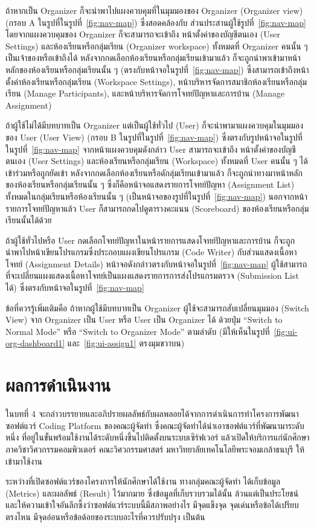 \documentclass[12pt,one side,openright,a4paper]{cpe-thesis-th}
\newcommand{\thaijustify}[1]{%
  \par\hspace{30pt}\justifying
  #1
}
\begin{document}
\thaijustify{
  ถ้าหากเป็น Organizer ก็จะนำพาไปแผงควบคุมที่ในมุมมองของ Organizer (Organizer view) (กรอบ A ในรูปที่ในรูปที่~\ref{fig:nav-map}) ซึ่งสอดคล้องกับ ส่วนประสานผู้ใช้รูปที่~\ref{fig:nav-map} โดยจากแผงควบคุมของ Organizer ก็จะสามารถจะเข้าถึง หน้าตั้งค่าของบัญชีตนเอง (User Settings) และห้องเรียนหรือกลุ่มเรียน (Organizer workspace) ทั้งหมดที่ Organizer คนนั้น ๆ เป็นเจ้าของหรือเข้าถึงได้ หลังจากกดเลือกห้องเรียนหรือกลุ่มเรียนเข้ามาแล้ว ก็จะถูกนำพาเข้ามาหน้าหลักของห้องเรียนหรือกลุ่มเรียนนั้น ๆ (ตรงกับหน้าจอในรูปที่~\ref{fig:nav-map}) ซึ่งสามารถเข้าถึงหน้าตั้งค่าห้องเรียนหรือกลุ่มเรียน (Workspace Settings), หน้าบริหารจัดการสมาชิกห้องเรียนหรือกลุ่มเรียน (Manage Participants), และหน้าบริหารจัดการโจทย์ปัญหาและการบ้าน (Manage Assignment)
}
\thaijustify{
  ถ้าผู้ใช้ไม่ได้มีบทบาทเป็น Organizer แต่เป็นผู้ใช้ทั่วไป (User) ก็จะนำพามาแผงควบคุมในมุมมองของ User (User View) (กรอบ B ในรูปที่ในรูปที่~\ref{fig:nav-map}) ซึ่งตรงกับรูปหน้าจอในรูปที่ในรูปที่~\ref{fig:nav-map} จากหน้าแผงควบคุมดังกล่าว User สามารถจะเข้าถึง หน้าตั้งค่าของบัญชีตนเอง (User Settings) และห้องเรียนหรือกลุ่มเรียน (Workspace) ทั้งหมดที่ User คนนั้น ๆ ได้เข้าร่วมหรือถูกยัดเข้า หลังจากกดเลือกห้องเรียนหรือดักลุ่มเรียนเข้ามาแล้ว ก็จะถูกนำทางมาหน้าหลักของห้องเรียนหรือกลุ่มเรียนนั้น ๆ ซึ่งก็คือหน้าจอแสดงรายการโจทย์ปัญหา (Assignment List) ทั้งหมดในกลุ่มเรียนหรือห้องเรียนนั้น ๆ (เป็นหน้าจอของรูปที่ในรูปที่~\ref{fig:nav-map}) นอกจากหน้ารายการโจทย์ปัญหาแล้ว User ก็สามารถกดไปดูตารางคะแนน (Scoreboard) ของห้องเรียนหรือกลุ่มเรียนนั้นได้ด้วย
}
\thaijustify{
  ถ้าผู้ใช้ทั่วไปหรือ User กดเลือกโจทย์ปัญหาในหน้ารายการแสดงโจทย์ปัญหาและการบ้าน ก็จะถูกนำพาไปหน้าเขียนโปรแกรมซึ่งประกอบแผงเขียนโปรแกรม (Code Writer) กับส่วนแสดงเนื้อหาโจทย์ (Assignment Details) หน้าจอดังกล่าวตรงกับหน้าจอในรูปที่~\ref{fig:nav-map} ผู้ใช้สามารถที่จะเปลี่ยนแผงแสดงเนื้อหาโจทย์เป็นแผงแสดงรายการการส่งโปรแกรมตรวจ (Submission List ได้) ซึ่งตรงกับหน้าจอในรูปที่~\ref{fig:nav-map}
}
\thaijustify{
  ข้อที่ควรรู้เพิ่มเติมคือ ถ้าหากผู้ใช้มีบทบาทเป็น Organizer ผู้ใช้จะสามารถสับเปลี่ยนมุมมอง (Switch View) จาก Organizer เป็น User หรือ User เป็น Organizer ได้ ด้วยปุ่ม “Switch to Normal Mode” หรือ “Switch to Organizer Mode” ตามลำดับ (มีให้เห็นในรูปที่~\ref{fig:ui-org-dashboard1} และ~\ref{fig:ui-assign1} ตรงมุมขวาบน)
}
\pagebreak
\pagebreak
\chapter{ผลการดำเนินงาน}
\thaijustify{
  ในบทที่ 4 จะกล่าวบรรยายและอภิปรายผลลัพธ์กับผลพลอยได้จากการดำเนินการทำโครงการพัฒนาซอฟต์แวร์ Coding Platform ของคณะผู้จัดทำ ซึ่งคณะผู้จัดทำได้นำเอาซอฟต์แวร์ที่พัฒนามาระดับหนึ่ง ที่อยู่ในขั้นพร้อมใช้งานได้ระดับหนึ่งขึ้นไปติดตั้งบนระบบเซิร์ฟเวอร์ แล้วเปิดให้บริการแก่นักศึกษาภาควิชาวิศวกรรมคอมพิวเตอร์ คณะวิศวกรรมศาสตร์ มหาวิทยาลัยเทคโนโลยีพระจอมเกล้าธนบุรี ให้เข้ามาใช้งาน
}
\thaijustify{
  ระหว่างที่เปิดซอฟต์แวร์ของโครงการให้นักศึกษาได้ใช้งาน ทางกลุ่มคณะผู้จัดทำ ได้เก็บข้อมูล (Metrics) และผลลัพธ์ (Result) ไว้มากมาย ซึ่งข้อมูลที่เก็บรวบรวมได้นั้น ล้วนแต่เป็นประโยชน์และให้ความเข้าใจอันลึกซึ้งว่าซอฟต์แวร์ระบบนี้มีสภาพอย่างไร มีจุดแข็งจุด จุดเด่นหรือข้อได้เปรียบตรงไหน มีจุดอ่อนหรือข้อด้อยของระบบอะไรที่ควรปรับปรุง เป็นต้น
}
\end{document}
